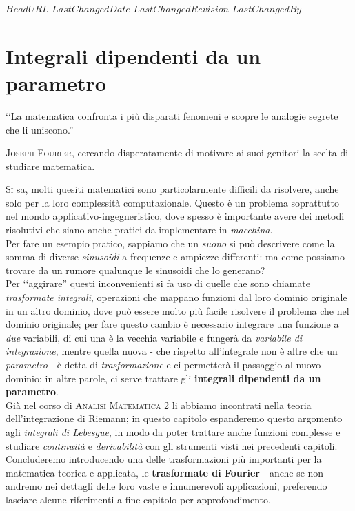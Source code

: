 \svnidlong
{$HeadURL$}
{$LastChangedDate$}
{$LastChangedRevision$}
{$LastChangedBy$}

\chapter{Integrali dipendenti da un parametro}

\begin{introduction}
	‘‘La matematica confronta i più disparati fenomeni e scopre le analogie segrete che li uniscono.''
	\begin{flushright}
		\textsc{Joseph Fourier,} cercando disperatamente di motivare ai suoi genitori la scelta di studiare matematica.
	\end{flushright}
\end{introduction}
\lettrine[findent=1pt, nindent=0pt]{S}{i} sa, molti quesiti matematici sono particolarmente difficili da risolvere, anche solo per la loro complessità computazionale. Questo è un problema soprattutto nel mondo applicativo-ingegneristico, dove spesso è importante avere dei metodi risolutivi che siano anche pratici da implementare in \textit{macchina}.\\
Per fare un esempio pratico, sappiamo che un \textit{suono} si può descrivere come la somma di diverse \textit{sinusoidi} a frequenze e ampiezze differenti: ma come possiamo trovare da un rumore qualunque le sinusoidi che lo generano?\\
Per ‘‘aggirare'' questi inconvenienti si fa uso di quelle che sono chiamate \textit{trasformate integrali}, operazioni che mappano funzioni dal loro dominio originale in un altro dominio, dove può essere molto più facile risolvere il problema che nel dominio originale; per fare questo cambio è necessario integrare una funzione a \textit{due} variabili, di cui una è la vecchia variabile e fungerà da \textit{variabile di integrazione}, mentre quella nuova - che rispetto all'integrale non è altre che un \textit{parametro} - è detta di \textit{trasformazione} e ci permetterà il passaggio al nuovo dominio; in altre parole, ci serve trattare gli \textbf{integrali dipendenti da un parametro}.\\
Già nel corso di \textsc{Analisi Matematica 2} li abbiamo incontrati nella teoria dell'integrazione di Riemann; in questo capitolo espanderemo questo argomento agli \textit{integrali di Lebesgue}, in modo da poter trattare anche funzioni complesse e studiare \textit{continuità} e \textit{derivabilità} con gli strumenti visti nei precedenti capitoli. Concluderemo introducendo una delle trasformazioni più importanti per la matematica teorica e applicata, le \textbf{trasformate di Fourier} - anche se non andremo nei dettagli delle loro vaste e innumerevoli applicazioni, preferendo lasciare alcune riferimenti a fine capitolo per approfondimento.\newpage
